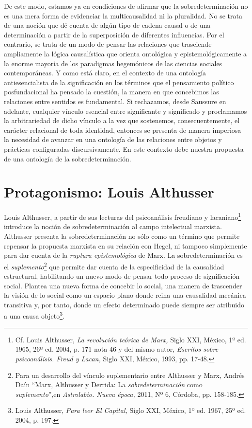 De este modo, estamos ya en condiciones de afirmar que la sobredeterminación no es una mera forma de evidenciar la multicausalidad ni la pluralidad. No se trata de una noción que dé cuenta de algún tipo de cadena causal o de una determinación a partir de la superposición de diferentes influencias. Por el contrario, se trata de un modo de pensar las relaciones que trasciende ampliamente la lógica causalística que orienta ontológica y epistemológicamente a la enorme mayoría de los paradigmas hegemónicos de las ciencias sociales contemporáneas. Y como está claro, en el contexto de una ontología antiesencialista de la significación en los términos que el pensamiento político posfundacional ha pensado la cuestión, la manera en que concebimos las relaciones entre sentidos es fundamental. Si rechazamos, desde Saussure en adelante, cualquier vínculo esencial entre significante y significado y proclamamos la arbitrariedad de dicho vínculo a la vez que sostenemos, consecuentemente, el carácter relacional de toda identidad, entonces se presenta de manera imperiosa la necesidad de avanzar en una ontología de las relaciones entre objetos y prácticas configuradas discursivamente. En este contexto debe nuestra propuesta de una ontología de la sobredeterminación.

\section{Protagonismo: Louis Althusser}

Louis Althusser, a partir de sus lecturas del psicoanálisis freudiano y lacaniano\footnote{Cf. Louis Althusser, \emph{La revolución teórica de Marx,} Siglo XXI, México, 1º ed. 1965, 26º ed. 2004, p. 171 nota 46 y del mismo autor, \emph{Escritos sobre psicoanálisis. Freud y Lacan,} Siglo XXI, México, 1993, pp. 17-48.} introduce la noción de sobredeterminación al campo intelectual marxista. Althusser presenta la sobredeterminación no sólo como un término que permite repensar la propuesta marxista en su relación con Hegel, ni tampoco simplemente para dar cuenta de la \emph{ruptura epistemológica} de Marx. La sobredeterminación es el \emph{suplemento}\footnote{Para un desarrollo del vínculo suplementario entre Althusser y Marx, Andrés Daín \enquote{Marx, Althusser y Derrida: La \emph{sobredeterminación} como \emph{suplemento}},en \emph{Astrolabio. Nueva época,} 2011, Nº 6, Córdoba, pp. 158-185.} que permite dar cuenta de la especificidad de la causalidad estructural, habilitando un nuevo modo de pensar todo proceso de significación social. Plantea una nueva forma de concebir lo social, una manera de trascender la visión de lo social como un espacio plano donde reina una causalidad mecánica transitiva y, por tanto, donde un efecto determinado puede siempre ser atribuido a una causa objeto\footnote{Louis Althusser, \emph{Para leer El Capital,} Siglo XXI, México, 1º ed. 1967, 25º ed. 2004, p. 197.}.

